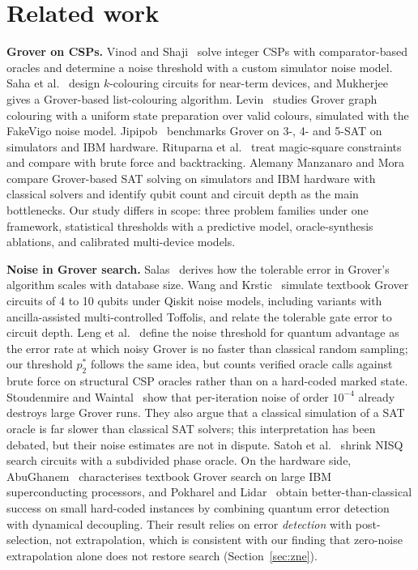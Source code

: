 \documentclass[conference]{IEEEtran}
\begin{document}
\section{Related work}

\textbf{Grover on CSPs.} Vinod and Shaji~\cite{vinod2021} solve integer CSPs with comparator-based oracles and determine a noise threshold with a custom simulator noise model. Saha et al.~\cite{saha2020} design $k$-colouring circuits for near-term devices, and Mukherjee~\cite{mukherjee2021} gives a Grover-based list-colouring algorithm. Levin~\cite{levin2023} studies Grover graph colouring with a uniform state preparation over valid colours, simulated with the FakeVigo noise model. Jipipob~\cite{jipipob2025} benchmarks Grover on 3-, 4- and 5-SAT on simulators and IBM hardware. Rituparna et al.~\cite{rituparna2026} treat magic-square constraints and compare with brute force and backtracking. Alemany Manzanaro and Mora~\cite{alemany2025} compare Grover-based SAT solving on simulators and IBM hardware with classical solvers and identify qubit count and circuit depth as the main bottlenecks. Our study differs in scope: three problem families under one framework, statistical thresholds with a predictive model, oracle-synthesis ablations, and calibrated multi-device models.

\textbf{Noise in Grover search.} Salas~\cite{salas2008} derives how the tolerable error in Grover's algorithm scales with database size. Wang and Krstic~\cite{wang2020} simulate textbook Grover circuits of 4 to 10 qubits under Qiskit noise models, including variants with ancilla-assisted multi-controlled Toffolis, and relate the tolerable gate error to circuit depth. Leng et al.~\cite{leng2023} define the noise threshold for quantum advantage as the error rate at which noisy Grover is no faster than classical random sampling; our threshold $p_2^*$ follows the same idea, but counts verified oracle calls against brute force on structural CSP oracles rather than on a hard-coded marked state. Stoudenmire and Waintal~\cite{stoudenmire2024} show that per-iteration noise of order $10^{-4}$ already destroys large Grover runs. They also argue that a classical simulation of a SAT oracle is far slower than classical SAT solvers; this interpretation has been debated, but their noise estimates are not in dispute. Satoh et al.~\cite{satoh2020} shrink NISQ search circuits with a subdivided phase oracle. On the hardware side, AbuGhanem~\cite{abughanem2025} characterises textbook Grover search on large IBM superconducting processors, and Pokharel and Lidar~\cite{pokharel2024} obtain better-than-classical success on small hard-coded instances by combining quantum error detection with dynamical decoupling. Their result relies on error \emph{detection} with post-selection, not extrapolation, which is consistent with our finding that zero-noise extrapolation alone does not restore search (Section~\ref{sec:zne}).
\end{document}
